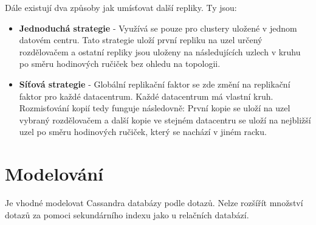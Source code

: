 \documentclass{article}
\begin{document}
Dále existují dva způsoby jak umísťovat další repliky. Ty jsou:

\begin{itemize}
\item \textbf{Jednoduchá strategie} - Využívá se pouze pro clustery uložené v jednom datovém centru. Tato strategie uloží první repliku na uzel určený rozdělovačem a ostatní repliky jsou uloženy na následujících uzlech v kruhu po směru hodinových ručiček bez ohledu na topologii.

\item \textbf{Síťová strategie} - Globální replikační faktor se zde změní na replikační faktor pro každé datacentrum. Každé datacentrum má vlastní kruh. Rozmisťování kopií tedy funguje následovně: První kopie se uloží na uzel vybraný rozdělovačem a další kopie ve stejném datacentru se uloží na nejbližší uzel po směru hodinových ručiček, který se nachází v jiném racku.
\end{itemize}

\section*{Modelování}

Je vhodné modelovat Cassandra databázy podle dotazů. Nelze rozšířít množství dotazů za pomoci sekundárního indexu jako u relačních databází.
\end{document}

